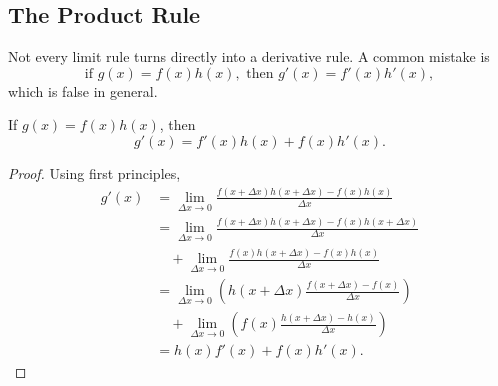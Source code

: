 \subsection{The Product Rule}

Not every limit rule turns directly into a derivative rule. A common mistake is
\[
\text{if } g(x)=f(x)h(x), \text{ then } g'(x)=f'(x)h'(x),
\]
which is false in general.

\begin{proposition}
If $g(x)=f(x)h(x)$, then
\[
  g'(x)=f'(x)h(x)+f(x)h'(x).
\]
\end{proposition}

\begin{proof}
Using first principles,
\begin{align*}
g'(x)
&= \lim_{\Delta x\to 0}\frac{f(x+\Delta x)h(x+\Delta x)-f(x)h(x)}{\Delta x} \\
&= \lim_{\Delta x\to 0}\frac{f(x+\Delta x)h(x+\Delta x)-f(x)h(x+\Delta x)}{\Delta x} \\
&\quad + \lim_{\Delta x\to 0}\frac{f(x)h(x+\Delta x)-f(x)h(x)}{\Delta x} \\
&= \lim_{\Delta x\to 0}\left(h(x+\Delta x)\frac{f(x+\Delta x)-f(x)}{\Delta x}\right) \\
&\quad + \lim_{\Delta x\to 0}\left(f(x)\frac{h(x+\Delta x)-h(x)}{\Delta x}\right) \\
&= h(x)f'(x)+f(x)h'(x).
\end{align*}
\end{proof}
